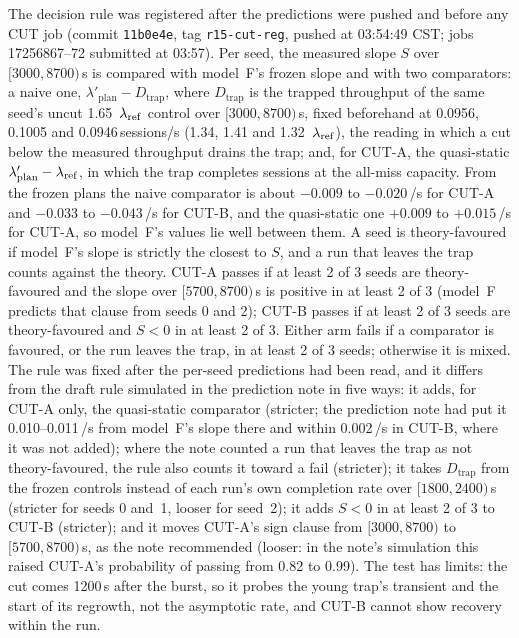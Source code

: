 \begin{itemize}[leftmargin=*,nosep]
The decision rule was registered after the predictions were pushed and before any CUT job (commit \texttt{11b0e4e}, tag
\texttt{r15-cut-reg}, pushed at 03:54:49 CST; jobs 17256867--72 submitted at 03:57). Per seed, the measured slope $S$ over
$[3000,8700)$\,s is compared with model~F's frozen slope and with two comparators: a naive one,
$\lambda'_{\mathrm{plan}}-D_{\mathrm{trap}}$, where $D_{\mathrm{trap}}$ is the trapped throughput of the same seed's uncut 1.65~$\lambda_{\mathrm{ref}}$
control over $[3000,8700)$\,s, fixed beforehand at 0.0956, 0.1005 and 0.0946\,sessions/s (1.34, 1.41 and 1.32~$\lambda_{\mathrm{ref}}$), the reading
in which a cut below the measured throughput drains the trap; and, for CUT-A, the quasi-static $\lambda'_{\mathrm{plan}}-\lambda_{\mathrm{ref}}$, in
which the trap completes sessions at the all-miss capacity. From the frozen plans the naive comparator is about $-0.009$ to
$-0.020$\,/s for CUT-A and $-0.033$ to $-0.043$\,/s for CUT-B, and the quasi-static one $+0.009$ to $+0.015$\,/s for CUT-A, so model~F's
values lie well between them. A seed is theory-favoured if model~F's slope is strictly the closest to $S$, and a run that leaves the
trap counts against the theory. CUT-A passes if at least 2 of 3 seeds are theory-favoured and the slope over $[5700,8700)$\,s is
positive in at least 2 of 3 (model~F predicts that clause from seeds 0 and 2); CUT-B passes if at least 2 of 3 seeds are
theory-favoured and $S<0$ in at least 2 of 3. Either arm fails if a comparator is favoured, or the run leaves the trap, in at least
2 of 3 seeds; otherwise it is mixed. The
rule was fixed after the per-seed predictions had been read, and it differs from the draft rule simulated in the prediction note in
five ways: it adds, for CUT-A only, the quasi-static comparator (stricter; the prediction note had put it 0.010--0.011\,/s from
model~F's slope there and within 0.002\,/s in CUT-B, where it was not added); where the note counted a run that leaves the trap as not
theory-favoured, the rule also counts it toward a fail (stricter); it takes $D_{\mathrm{trap}}$ from the frozen controls instead of
each run's own completion rate over $[1800,2400)$\,s (stricter for seeds 0 and~1, looser for seed~2); it adds $S<0$ in at least 2 of
3 to CUT-B (stricter); and it moves CUT-A's sign clause from $[3000,8700)$ to $[5700,8700)$\,s, as the note recommended (looser: in
the note's simulation this raised CUT-A's probability of passing from 0.82 to 0.99). The test has limits: the cut comes 1200\,s
after the burst, so it probes the young trap's transient and the start of its regrowth, not the asymptotic rate, and CUT-B cannot
show recovery within the run.


\end{itemize}
